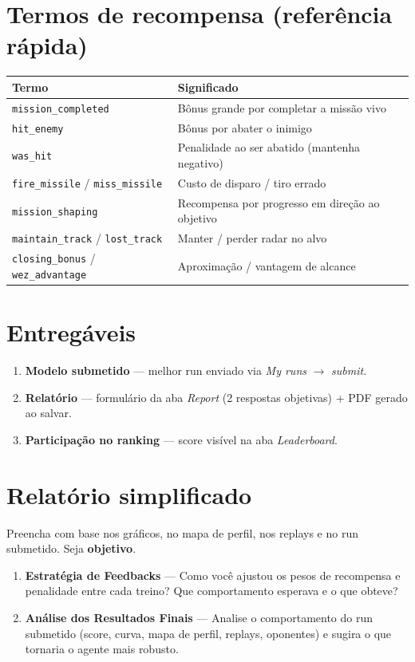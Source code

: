 \documentclass[11pt,a4paper]{article}
\begin{document}
\section{Termos de recompensa (referência rápida)}
\begin{tabular}{@{}p{}p{}@{}}
  \toprule
  \textbf{Termo} & \textbf{Significado} \\
  \midrule
  \texttt{mission\_completed} & Bônus grande por completar a missão vivo \\
  \texttt{hit\_enemy} & Bônus por abater o inimigo \\
  \texttt{was\_hit} & Penalidade ao ser abatido (mantenha negativo) \\
  \texttt{fire\_missile} / \texttt{miss\_missile} & Custo de disparo / tiro errado \\
  \texttt{mission\_shaping} & Recompensa por progresso em direção ao objetivo \\
  \texttt{maintain\_track} / \texttt{lost\_track} & Manter / perder radar no alvo \\
  \texttt{closing\_bonus} / \texttt{wez\_advantage} & Aproximação / vantagem de alcance \\
  \bottomrule
\end{tabular}

\section{Entregáveis}
\begin{enumerate}[label=\textbf{E\arabic*.}]
  \item \textbf{Modelo submetido} — melhor run enviado via \emph{My runs} $\rightarrow$ \emph{submit}.
  \item \textbf{Relatório} — formulário da aba \emph{Report} (2 respostas objetivas) + PDF gerado ao salvar.
  \item \textbf{Participação no ranking} — score visível na aba \emph{Leaderboard}.
\end{enumerate}

\section{Relatório simplificado}\label{sec:relatorio}
Preencha com base nos gráficos, no mapa de perfil, nos replays e no run submetido. Seja \textbf{objetivo}.

\begin{enumerate}[label=\textbf{R\arabic*.}]
  \item \textbf{Estratégia de Feedbacks} — Como você ajustou os pesos de recompensa e penalidade entre cada treino? Que comportamento esperava e o que obteve?
  \item \textbf{Análise dos Resultados Finais} — Analise o comportamento do run submetido (score, curva, mapa de perfil, replays, oponentes) e sugira o que tornaria o agente mais robusto.
\end{enumerate}
\end{document}
